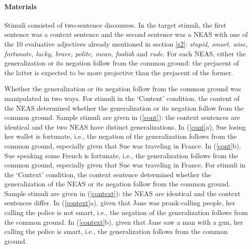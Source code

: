 \documentclass[11pt,fleqn]{article}
\newcommand{\6}{\mbox{$[\hspace*{-.6mm}[$}}
\newcommand{\9}{\mbox{$]\hspace*{-.6mm}]$}}
\begin{document}
\paragraph{Materials} Stimuli consisted of two-sentence discourses. In the target stimuli, the first sentence was a context sentence and the second sentence was a NEAS with one of the 10 evaluative adjectives already mentioned in section \ref{s2}: {\em stupid, smart, wise, fortunate, lucky, brave, polite, mean, foolish} and {\em rude}. For each NEAS, either the generalization or its negation follow from the common ground: the prejacent of the latter is expected to be more projective than the prejacent of the former.

Whether the generalization or its negation follow from the common ground was manipulated in two ways. For stimuli in the `Content' condition, the content of the NEAS determined whether the generalization or its negation follow from the common ground. Sample stimuli are given in (\ref{cont}): the context sentences are identical and the two NEAS have distinct generalizations. In (\ref{cont}a), Sue losing her wallet is fortunate, i.e., the negation of the generalization follows from the common ground, especially given that Sue was traveling in France. In (\ref{cont}b), Sue speaking some French is fortunate, i.e., the generalization follows from the common ground, especially given that Sue was traveling in France. For stimuli in the `Context' condition, the context sentence determined whether the generalization of the NEAS or its negation follow from the common ground. Sample stimuli are given in (\ref{context}): the NEAS are identical and the context sentences differ. In (\ref{context}a), given that Jane was prank-calling people, her calling the police is not smart, i.e., the negation of the generalization follows from the common ground. In (\ref{context}b), given that Jane saw a man with a gun, her calling the police is smart, i.e., the generalization follows from the common ground.
\end{document}
